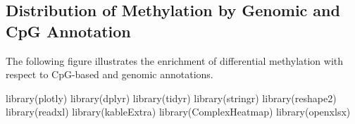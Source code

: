 \documentclass[
  10pt,
]{article}
\newenvironment{Shaded}{\begin{snugshade}}{\end{snugshade}}
\newcommand{\FunctionTok}[1]{\textcolor[rgb]{0.00,0.00,0.00}{#1}}
\newcommand{\NormalTok}[1]{#1}
\begin{document}
\hypertarget{distribution-of-methylation-by-genomic-and-cpg-annotation}{%
\subsection{Distribution of Methylation by Genomic and CpG
Annotation}\label{distribution-of-methylation-by-genomic-and-cpg-annotation}}

The following figure illustrates the enrichment of differential
methylation with respect to CpG-based and genomic annotations.

\begin{Shaded}
\begin{Highlighting}[]
\FunctionTok{library}\NormalTok{(plotly)}
\FunctionTok{library}\NormalTok{(dplyr)}
\FunctionTok{library}\NormalTok{(tidyr)}
\FunctionTok{library}\NormalTok{(stringr)}
\FunctionTok{library}\NormalTok{(reshape2)}
\FunctionTok{library}\NormalTok{(readxl)}
\FunctionTok{library}\NormalTok{(kableExtra)}
\FunctionTok{library}\NormalTok{(ComplexHeatmap)}
\FunctionTok{library}\NormalTok{(openxlsx)}


\end{Highlighting}
\end{Shaded}
\end{document}
